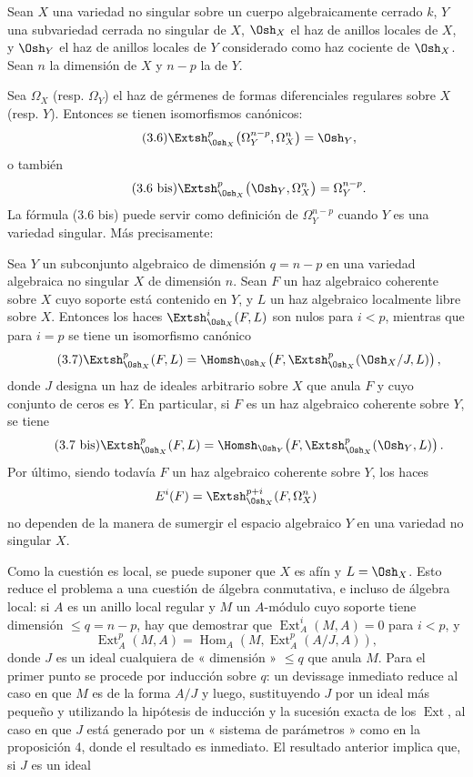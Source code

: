  Sean $X$ una variedad no singular sobre un cuerpo
algebraicamente cerrado $k$, $Y$ una subvariedad cerrada no singular de $X$,
$\Osh_X$ el haz de anillos locales de $X$, y $\Osh_Y$ el haz de anillos
locales de $Y$ considerado como haz cociente de $\Osh_X$. Sean $n$ la
dimensión de $X$ y $n-p$ la de $Y$.

Sea $\Omega_X$ (resp. $\Omega_Y$) el haz de gérmenes de formas
diferenciales regulares sobre $X$ (resp. $Y$). Entonces se tienen isomorfismos
canónicos:
\begin{equation}\tag{3.6}
  \Extsh_{\Osh_X}^{p}\bigl(\Omega_Y^{n-p},\Omega_X^{n}\bigr)=\Osh_Y,
\end{equation}
o también
\begin{equation}\tag{3.6 bis}
  \Extsh_{\Osh_X}^{p}\bigl(\Osh_Y,\Omega_X^{n}\bigr)=\Omega_Y^{n-p}.
\end{equation}
La fórmula (3.6 bis) puede servir como definición de $\Omega_Y^{n-p}$ cuando $Y$
es una variedad singular. Más precisamente:

 Sea $Y$ un subconjunto algebraico de dimensión
$q=n-p$ en una variedad algebraica no singular $X$ de dimensión $n$. Sean
$F$ un haz algebraico coherente sobre $X$ cuyo soporte está contenido en $Y$, y $L$
un haz algebraico localmente libre sobre $X$. Entonces los haces
$\Extsh_{\Osh_X}^{i}(F,L)$ son nulos para $i<p$, mientras que para $i=p$ se tiene un
isomorfismo canónico
\begin{equation}\tag{3.7}
  \Extsh_{\Osh_X}^{p}(F,L)
  =\Homsh_{\Osh_X}\!\left(F,
  \Extsh_{\Osh_X}^{p}(\Osh_X/J,L)\right),
\end{equation}
donde $J$ designa un haz de ideales arbitrario sobre $X$ que anula $F$ y cuyo
conjunto de ceros es $Y$. En particular, si $F$ es un haz algebraico
coherente sobre $Y$, se tiene
\begin{equation}\tag{3.7 bis}
  \Extsh_{\Osh_X}^{p}(F,L)
  =\Homsh_{\Osh_Y}\!\left(F,\Extsh_{\Osh_X}^{p}(\Osh_Y,L)\right).
\end{equation}
Por último, siendo todavía $F$ un haz algebraico coherente sobre $Y$, los haces
\[
  E^{i}(F)=\Extsh_{\Osh_X}^{p+i}(F,\Omega_X^{n})
\]
no dependen de la manera de sumergir el espacio algebraico $Y$ en una variedad
no singular $X$.

Como la cuestión es local, se puede suponer que $X$ es afín y $L=\Osh_X$. Esto reduce
el problema a una cuestión de álgebra conmutativa, e incluso de álgebra local: si $A$ es un
anillo local regular y $M$ un $A$-módulo cuyo soporte tiene dimensión
$\leq q=n-p$, hay que demostrar que $\operatorname{Ext}_{A}^{i}(M,A)=0$ para $i<p$, y
\[
  \operatorname{Ext}_{A}^{p}(M,A)
  =\operatorname{Hom}_{A}\!\left(M,\operatorname{Ext}_{A}^{p}(A/J,A)\right),
\]
donde $J$ es un ideal cualquiera de « dimensión » $\leq q$ que anula $M$. Para el
primer punto se procede por inducción sobre $q$: un devissage inmediato reduce
al caso en que $M$ es de la forma $A/J$ y luego, sustituyendo $J$ por un ideal más
pequeño y utilizando la hipótesis de inducción y la sucesión exacta de los
$\operatorname{Ext}$, al caso en que $J$ está generado por un « sistema de parámetros »
como en la proposición 4, donde el resultado es inmediato. El resultado
anterior implica que, si $J$ es un ideal

